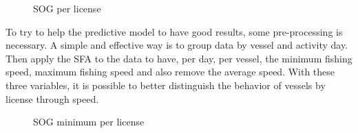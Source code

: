 \begin{figure}[H]
\centering
{}
\caption{SOG per license}
\label{fig:sogall}
\end{figure}

To try to help the predictive model to have good results, some pre-processing is necessary. A simple and effective way is to group data by vessel and activity day. Then apply the SFA to the data to have, per day, per vessel, the minimum fishing speed, maximum fishing speed and also remove the average speed.
With these three variables, it is possible to better distinguish the behavior of vessels by license through speed.

\begin{figure}
\centering
{}
\caption{SOG minimum per license}
\label{fig:sogminall}
\end{figure}



